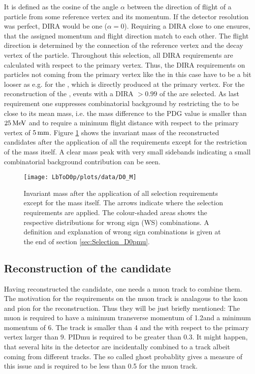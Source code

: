 It is defined as the cosine of the angle $\alpha$ between the direction of flight of a particle from some reference vertex and its momentum.
If the detector resolution was perfect, DIRA would be one ($\alpha = 0$).
Requiring a DIRA close to one ensures, that the assigned momentum and flight direction match to each other.
The flight direction is determined by the connection of the reference vertex and the decay vertex of the particle.
Throughout this selection, all DIRA requirements are calculated with respect to the primary vertex.
Thus, the DIRA requirements on particles not coming from the primary vertex like the \Dz in this case have to be a bit looser as e.g. for the \Lb, which is directly produced at the primary vertex.
For the reconstruction of the \Dz, events with a DIRA $>0.99$ of the \Dz are selected.
As last requirement one suppresses combinatorial background by restricting the \Dz to be close to its mean mass, i.e. the mass difference to the PDG value is smaller than $25 \mathrm{\,Me\kern -0.1em V}$ and to require a minimum \Dz flight distance with respect to the primary vertex of $5 \rm \,mm$.
Figure \ref{fig:plot_mD0} shows the invariant mass of the reconstructed \Dz candidates after the application of all the requirements except for the restriction of the \Dz mass itself.
A clear mass peak with very small sidebands indicating a small combinatorial background contribution can be seen.
\begin{figure}[tb]
	\centering
	\texttt{[image: LbToD0p/plots/data/D0\_M]}
	\caption{Invariant \Dz mass after the application of all selection requirements except for the \Dz mass itself.
             The arrows indicate where the selection requirements are applied.
             The colour-shaded areas shows the respective distributions for wrong sign (WS) combinations.
             A definition and explanation of wrong sign combinations is given at the end of section \ref{sec:Selection_D0pmu}.}
	\label{fig:plot_mD0}
\end{figure}

\subsection{Reconstruction of the \Dz\mun candidate}
\label{sec:Selection_D0mu}
Having reconstructed the \Dz candidate, one needs a muon track to combine them.
The motivation for the requirements on the muon track is analagous to the kaon and pion for the \Dz reconstruction.
Thus they will be just briefly mentioned:
The muon is required to have a minimum transverse momentum of 1.2\gev and a minimum momentum of 6\gev.
The track \chisqndf is smaller than 4 and the \chisqip with respect to the primary vertex larger than 9.
PIDmu is required to be greater than 0.3.
It might happen, that several hits in the detector are incidentally combined to a track albeit coming from different tracks.
The so called ghost probablity gives a measure of this issue and is required to be less than 0.5 for the muon track.

